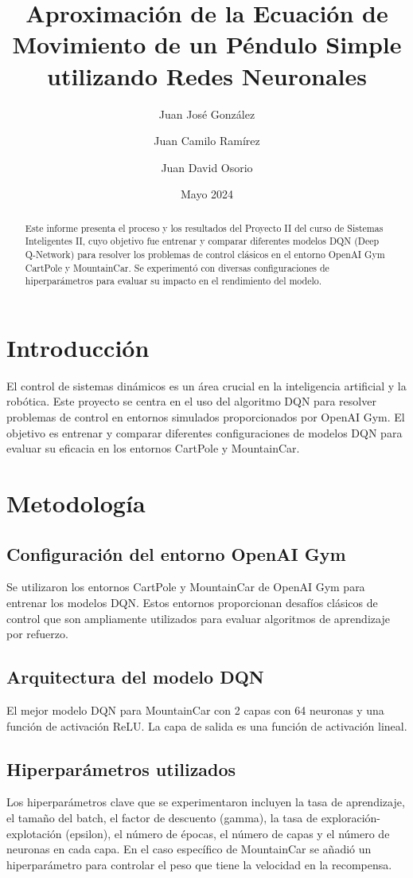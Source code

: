 \documentclass[a4paper,12pt]{article}
\title{Aproximación de la Ecuación de Movimiento de un Péndulo Simple utilizando Redes Neuronales}
\author{Juan José González}
\author{Juan Camilo Ramírez}
\author{Juan David Osorio}
\date{Mayo 2024}
\begin{document}
\maketitle

\begin{abstract}
    Este informe presenta el proceso y los resultados del Proyecto II del curso de Sistemas Inteligentes II, cuyo objetivo fue entrenar y comparar diferentes modelos DQN (Deep Q-Network) para resolver los problemas de control clásicos en el entorno OpenAI Gym CartPole y MountainCar. Se experimentó con diversas configuraciones de hiperparámetros para evaluar su impacto en el rendimiento del modelo.
\end{abstract}

\section{Introducción}
El control de sistemas dinámicos es un área crucial en la inteligencia artificial y la robótica. Este proyecto se centra en el uso del algoritmo DQN para resolver problemas de control en entornos simulados proporcionados por OpenAI Gym. El objetivo es entrenar y comparar diferentes configuraciones de modelos DQN para evaluar su eficacia en los entornos CartPole y MountainCar.

\section{Metodología}
\subsection{Configuración del entorno OpenAI Gym}
Se utilizaron los entornos CartPole y MountainCar de OpenAI Gym para entrenar los modelos DQN. Estos entornos proporcionan desafíos clásicos de control que son ampliamente utilizados para evaluar algoritmos de aprendizaje por refuerzo.

\subsection{Arquitectura del modelo DQN}
El mejor modelo DQN para MountainCar con 2 capas con 64 neuronas y una función de activación ReLU. La capa de salida es una función de activación lineal.

\subsection{Hiperparámetros utilizados}
Los hiperparámetros clave que se experimentaron incluyen la tasa de aprendizaje, el tamaño del batch, el factor de descuento (gamma), la tasa de exploración-explotación (epsilon), el número de épocas, el número de capas y el número de neuronas en cada capa. En el caso específico de MountainCar se añadió un hiperparámetro para controlar el peso que tiene la velocidad en la recompensa.
\end{document}

